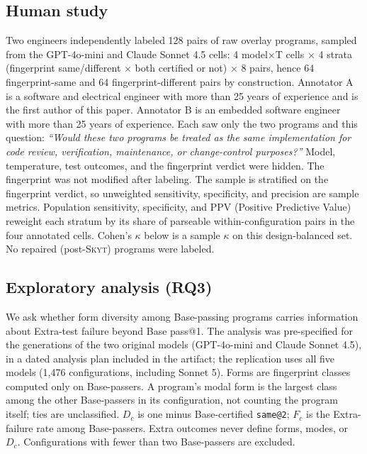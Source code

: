\documentclass[acmsmall,screen,review,anonymous]{acmart}
\makeatletter
\newcommand{\skyt}{\textsc{Skyt}}
\newcommand{\sameat}{\mbox{\texttt{same@2}}}
\makeatother
\begin{document}
\subsection{Human study}
\label{sec:human-setup}
Two engineers independently labeled 128 pairs of raw overlay programs,
sampled from the GPT-4o-mini and Claude Sonnet 4.5 cells: 4 model$\times$T
cells $\times$ 4 strata (fingerprint same/different $\times$ both certified or
not) $\times$ 8 pairs, hence 64 fingerprint-same and 64 fingerprint-different
pairs by construction.
Annotator A is a software and electrical engineer with more than 25 years of
experience and is the first author of this paper.
Annotator B is an embedded software engineer with more than 25 years of
experience.
Each saw only the two programs and this question:
\emph{``Would these two programs be treated as the same implementation for
code review, verification, maintenance, or change-control purposes?''}
Model, temperature, test outcomes, and the fingerprint verdict were hidden.
The fingerprint was not modified after labeling.
The sample is stratified on the fingerprint verdict, so unweighted
sensitivity, specificity, and precision are sample metrics.
Population sensitivity, specificity, and PPV (Positive Predictive Value) reweight each stratum by its
share of parseable within-configuration pairs in the four annotated cells.
Cohen's $\kappa$ below is a sample $\kappa$ on this design-balanced set.
No repaired (post-\skyt{}) programs were labeled.

\subsection{Exploratory analysis (RQ3)}
We ask whether form diversity among Base-passing programs carries information
about Extra-test failure beyond Base pass@1.
The analysis was pre-specified for the generations of the two original models
(GPT-4o-mini and Claude Sonnet 4.5), in a dated analysis plan included in the artifact; the replication uses
all five models (1{,}476 configurations, including Sonnet 5).
Forms are fingerprint classes computed only on Base-passers.
A program's modal form is the largest class among the other Base-passers in
its configuration, not counting the program itself; ties are unclassified.
$D_c$ is one minus Base-certified \sameat{}; $F_c$ is the Extra-failure rate
among Base-passers.
Extra outcomes never define forms, modes, or $D_c$.
Configurations with fewer than two Base-passers are excluded.
\end{document}
